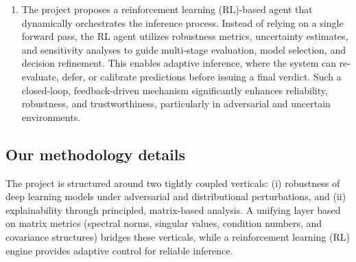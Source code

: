 \documentclass[a4paper,11pt]{article}
\begin{document}
\begin{enumerate}
	\item The project proposes a reinforcement learning (RL)-based agent that dynamically orchestrates the inference process. Instead of relying on a single forward pass, the RL agent utilizes robustness metrics, uncertainty estimates, and sensitivity analyses to guide multi-stage evaluation, model selection, and decision refinement. This enables adaptive inference, where the system can re-evaluate, defer, or calibrate predictions before issuing a final verdict. Such a closed-loop, feedback-driven mechanism significantly enhances reliability, robustness, and trustworthiness, particularly in adversarial and uncertain environments.
	
\end{enumerate}

\subsection{Our methodology details}


The project is structured around two tightly coupled verticals: (i) robustness of deep learning models under adversarial and distributional perturbations, and (ii) explainability through principled, matrix-based analysis. A unifying layer based on matrix metrics (spectral norms, singular values, condition numbers, and covariance structures) bridges these verticals, while a reinforcement learning (RL) engine provides adaptive control for reliable inference.
\end{document}
